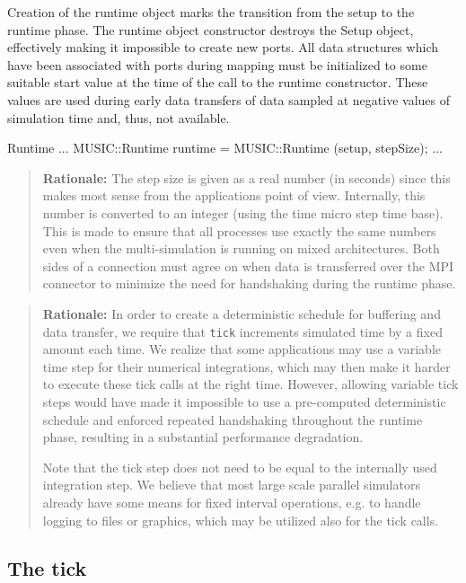 \documentclass[a4paper,twoside]{report}
\newenvironment{rationale}%
{\par\begin{quote}\textbf{Rationale:}}%
{\par\end{quote}}
\begin{document}
Creation of the runtime object marks the transition from the setup to
the runtime phase.  The runtime object constructor destroys the Setup
object, effectively making it impossible to create new ports.  All
data structures which have been associated with ports during mapping
must be initialized to some suitable start value at the time of the
call to the runtime constructor.  These values are used during early
data transfers of data sampled at negative values of simulation time
and, thus, not available.

\begin{code}{Runtime}
...
MUSIC::Runtime runtime = MUSIC::Runtime (setup, stepSize);
...
\end{code}

\begin{rationale}
  The step size is given as a real number (in seconds) since this
  makes most sense from the applications point of view.  Internally,
  this number is converted to an integer (using the time micro step
  time base).  This is made to ensure that all processes use exactly
  the same numbers even when the multi-simulation is running on mixed
  architectures.  Both sides of a connection must agree on when data
  is transferred over the MPI connector to minimize the
  need for handshaking during the runtime phase.
\end{rationale}

\begin{rationale}
  In order to create a deterministic schedule for buffering and data
  transfer, we require that \lstinline|tick| increments simulated time
  by a fixed amount each time.  We realize that some applications may
  use a variable time step for their
  numerical integrations, which may then make it harder to execute
  these tick calls at the right time.  However, allowing variable tick
  steps would have made it impossible to use a pre-computed
  deterministic schedule and enforced repeated handshaking throughout
  the runtime phase, resulting in a substantial performance
  degradation.

  Note that the tick step does not need to be equal to the internally
  used integration step.  We believe that most
  large scale parallel simulators already have some means for fixed
  interval operations, e.g. to handle logging to files or graphics,
  which may be utilized also for the tick calls.
\end{rationale}


\subsection{The tick}
\end{document}
